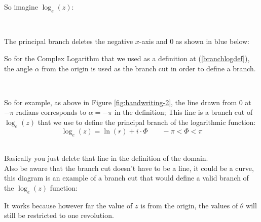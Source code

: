 \documentclass[class=article, crop=false]{standalone}
\begin{document}
So imagine $\log_e{\left( z \right) }$:
\ \

\ \
%

The principal branch deletes the negative $x$-axis and $0$ as shown in blue below:


\newpage


So for the Complex Logarithm that we used as a definition at (\ref{branchlogdef}), the angle $\alpha$ from the origin is used as the branch cut in order to define a branch.

\ \

\hfill\begin{minipage}{\dimexpr\textwidth-3cm}
  So for example, as above in Figure \ref{fig:handwriting-2}, the line drawn from $0$ at $-\pi$ radians corresponds to $\alpha = - \pi$ in the definition; This line is a branch cut of $\log_e{\left( z \right) }$ that we use to define the principal branch of the logarithmic function:
  \[
  \log_e{\left( z \right) } = \ln{ \left( r \right)  }+ i\cdot \Phi \qquad -\pi < \Phi < \pi
  \]
\end{minipage}
\ \\

Basically you just delete that line in the definition of the domain.\\

Also be aware that the branch cut doesn't have to be a line, it could be a curve, this diagram is an example of a branch cut that would define a valid branch of the $\log_e{\left( z \right) }$ function:


It works because however far the value of $z$ is from the origin, the values of $\theta$ will still be restricted to one revolution.
\end{document}
